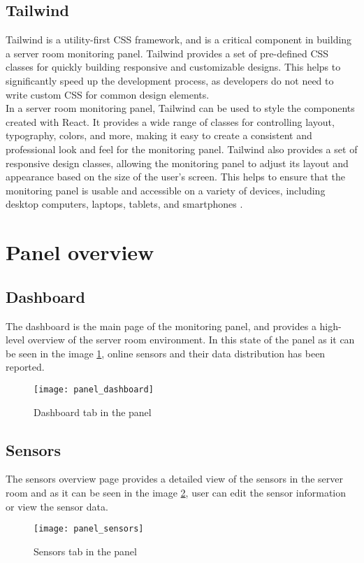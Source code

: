     \subsection{Tailwind}
    Tailwind is a utility-first CSS framework, and is a critical component in building a server room monitoring panel. Tailwind provides a set of pre-defined CSS classes for quickly building responsive and customizable designs. This helps to significantly speed up the development process, as developers do not need to write custom CSS for common design elements.\\
    In a server room monitoring panel, Tailwind can be used to style the components created with React. It provides a wide range of classes for controlling layout, typography, colors, and more, making it easy to create a consistent and professional look and feel for the monitoring panel. Tailwind also provides a set of responsive design classes, allowing the monitoring panel to adjust its layout and appearance based on the size of the user's screen. This helps to ensure that the monitoring panel is usable and accessible on a variety of devices, including desktop computers, laptops, tablets, and smartphones \cite{tailwind}.

\section{Panel overview}
    \subsection{Dashboard}
    The dashboard is the main page of the monitoring panel, and provides a high-level overview of the server room environment. In this state of the panel as it can be seen in the image \ref{panel_dashboard}, online sensors and their data distribution has been reported.
    \begin{figure}
        \centering
        \texttt{[image: panel\_dashboard]}
        \caption{Dashboard tab in the panel}
        \label{panel_dashboard}
    \end{figure}
    \subsection{Sensors}
    The sensors overview page provides a detailed view of the sensors in the server room and as it can be seen in the image \ref{panel_sensors}, user can edit the sensor information or view the sensor data.
    \begin{figure}
        \centering
        \texttt{[image: panel\_sensors]}
        \caption{Sensors tab in the panel}
        \label{panel_sensors}
    \end{figure}
